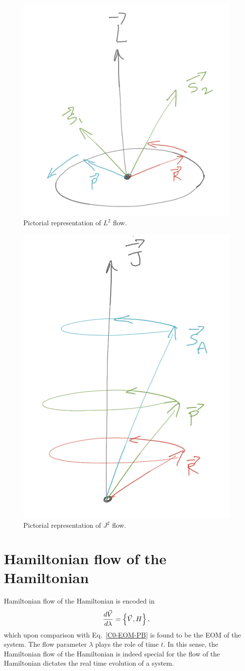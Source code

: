 \begin{figure}
    \centering
  \includegraphics[width=0.4 \linewidth]{Lsq_flow}
  \caption{Pictorial representation of $L^2$ flow.
    \vspace{-1.em}
  }
  \label{Lsq_flow}
\end{figure}




\begin{figure}
  \centering
  \includegraphics[width=0.4\linewidth]{Jsq_flow}
  \caption{Pictorial representation of $J^2$ flow.
    \vspace{-1.em}
  }
  \label{Jsq_flow}
\end{figure}




\section{Hamiltonian flow of the Hamiltonian}


Hamiltonian flow of the Hamiltonian is encoded in 
\begin{align}
\frac{d \vec{V}}{d \lambda}  =   \left\lbrace \vec{V}, H \right\rbrace,
\end{align}
which upon comparison with Eq.~\eqref{C0-EOM-PB} is found to
be the EOM of the system. The flow parameter $\lambda$ plays the role of
time $t$. In this sense, the Hamiltonian flow of the 
Hamiltonian is indeed special for the flow of the Hamiltonian
dictates the real time evolution of a system.
























